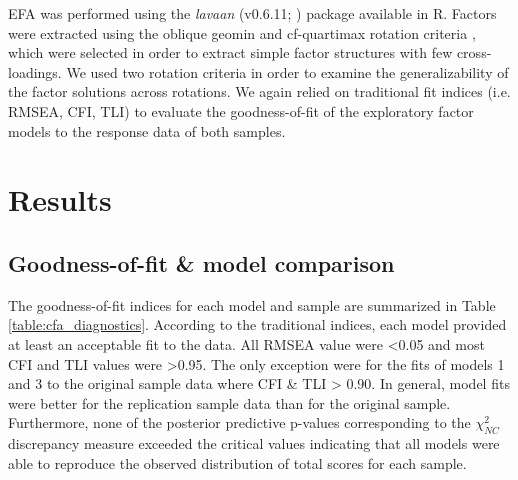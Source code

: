 \documentclass[letterpaper,man,natbib,noextraspace,floatsintext,longtable]{apa6}
\begin{document}
EFA was performed using the \textit{lavaan} (v0.6.11; \citealt{lavaan}) package available in R. Factors were extracted using the oblique geomin \citep{yates1987multivariate} and cf-quartimax rotation criteria \citep{crawford1970general}, which were selected in order to extract simple factor structures with few cross-loadings. We used two rotation criteria in order to examine the generalizability of the factor solutions across rotations. We again relied on traditional fit indices (i.e. RMSEA, CFI, TLI) to evaluate the goodness-of-fit of the exploratory factor models to the response data of both samples.

\section{Results}

\subsection{Goodness-of-fit \& model comparison}

The goodness-of-fit indices for each model and sample are summarized in Table \ref{table:cfa_diagnostics}. According to the traditional indices, each model provided at least an acceptable fit to the data. All RMSEA value were <0.05 and most CFI and TLI values were >0.95. The only exception were for the fits of models 1 and 3 to the original sample data where CFI \& TLI > 0.90. In general, model fits were better for the replication sample data than for the original sample. Furthermore, none of the posterior predictive p-values corresponding to the $\chi^2_{NC}$ discrepancy measure exceeded the critical values indicating that all models were able to reproduce the observed distribution of total scores for each sample.
\end{document}
